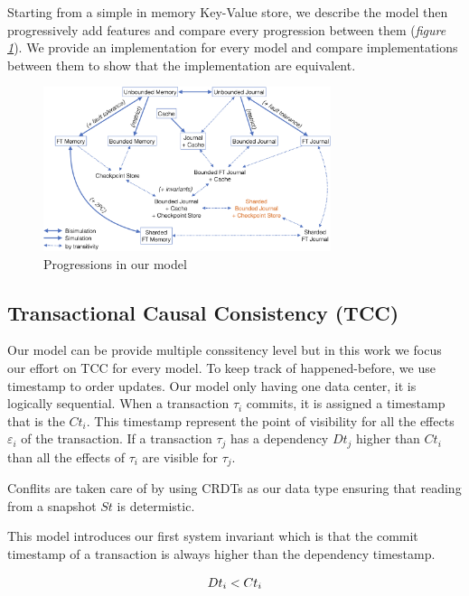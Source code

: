 \documentclass[systeme]{compas2022}
\begin{document}
Starting from a simple in memory Key-Value store, we describe the model then progressively add features and compare every progression between them (\emph{figure \ref{fig:transitions}}).
We provide an implementation for every model and compare implementations between them to show that the implementation are equivalent.

\begin{figure}[tp]
  \centering
  \includegraphics[width=0.75\textwidth]{figures/transitions.png}
  \caption{Progressions in our model}
  \label{fig:transitions}
\end{figure}

\subsection{Transactional Causal Consistency (TCC)}

Our model can be provide multiple conssitency level but in this work we focus our effort on TCC for every model.
To keep track of happened-before, we use timestamp to order updates.
Our model only having one data center, it is logically sequential.
When a transaction $\tau_i$ commits, it is assigned a timestamp that is the $Ct_i$.
This timestamp represent the point of visibility for all the effects $\varepsilon_i$ of the transaction.
If a transaction $\tau_j$ has a dependency $Dt_j$ higher than $Ct_i$ than all the effects of $\tau_i$ are visible for $\tau_j$.

Conflits are taken care of by using CRDTs as our data type ensuring that reading from a snapshot $St$ is determistic.

This model introduces our first system invariant which is that the commit timestamp of a transaction is always higher than the dependency timestamp.

\[
  \begin{array}{lcl}
    \emph{$Dt_i < Ct_i$}
  \end{array} 
\]
\end{document}
